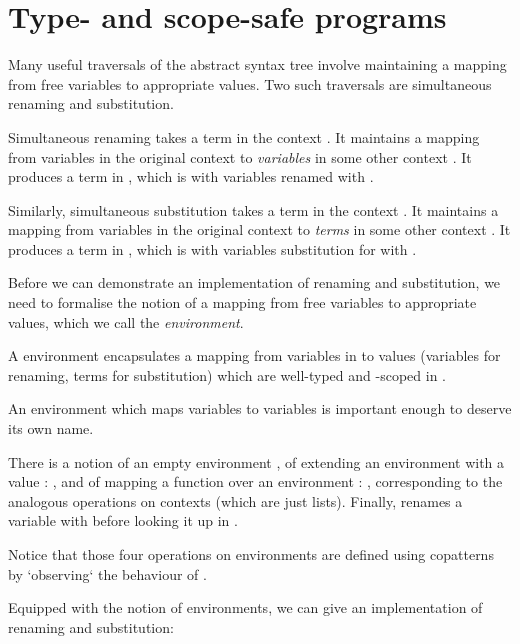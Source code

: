 \documentclass[bsc,frontabs,oneside,singlespacing,parskip,deptreport]{infthesis}
\theoremstyle{definition}
\begin{document}
\section{Type- and scope-safe programs}
\label{sec:typ-scop-saf-prog}

Many useful traversals of the abstract syntax tree involve maintaining
a mapping from free variables to appropriate values. Two such
traversals are simultaneous renaming and substitution.

Simultaneous renaming takes a term  in the context . It maintains
a mapping  from variables in the original context  to
\textit{variables} in some other context . It produces a term in
, which is  with variables renamed with .

Similarly, simultaneous substitution takes a term  in the context
. It maintains a mapping  from variables in the original context
 to \textit{terms} in some other context . It produces a
term in , which is  with variables substitution for with .

Before we can demonstrate an implementation of renaming and
substitution, we need to formalise the notion of a mapping from free
variables to appropriate values, which we call the
\textit{environment}.


A environment  encapsulates a mapping from variables in
 to values  (variables for renaming, terms for
substitution) which are well-typed and -scoped in .

An environment which maps variables to variables is important enough
to deserve its own name.


There is a notion of an empty environment , of extending an
environment  with a value : , and of mapping a
function  over an environment : ,
corresponding to the analogous operations on contexts (which are just
lists). Finally,  renames a variable with 
before looking it up in .


Notice that those four operations on environments are defined using
copatterns \cite{DBLP:conf/popl/AbelPTS13} by `observing` the
behaviour of .

Equipped with the notion of environments, we can give an
implementation of renaming and substitution:
\end{document}
